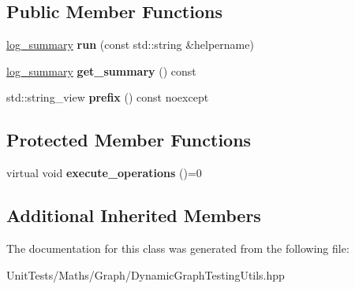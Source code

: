 \subsection*{Public Member Functions}
\begin{DoxyCompactItemize}
\item 
\mbox{\label{classsequoia_1_1unit__testing_1_1graph__operations_aadcebeabe3bca6defec7a48ba0cdb7bd}} 
\mbox{\hyperlink{classsequoia_1_1unit__testing_1_1log__summary}{log\+\_\+summary}} {\bfseries run} (const std\+::string \&helpername)
\item 
\mbox{\label{classsequoia_1_1unit__testing_1_1graph__operations_a82dfc33c8a43bdd09a0be92e176605ea}} 
\mbox{\hyperlink{classsequoia_1_1unit__testing_1_1log__summary}{log\+\_\+summary}} {\bfseries get\+\_\+summary} () const
\item 
\mbox{\label{classsequoia_1_1unit__testing_1_1graph__operations_a527166f8dffca1df1527b630a9c641f6}} 
std\+::string\+\_\+view {\bfseries prefix} () const noexcept
\end{DoxyCompactItemize}
\subsection*{Protected Member Functions}
\begin{DoxyCompactItemize}
\item 
\mbox{\label{classsequoia_1_1unit__testing_1_1graph__operations_a97a9f165be00e6dae93c95e538aaf974}} 
virtual void {\bfseries execute\+\_\+operations} ()=0
\end{DoxyCompactItemize}
\subsection*{Additional Inherited Members}


The documentation for this class was generated from the following file\+:\begin{DoxyCompactItemize}
\item 
Unit\+Tests/\+Maths/\+Graph/Dynamic\+Graph\+Testing\+Utils.\+hpp\end{DoxyCompactItemize}
